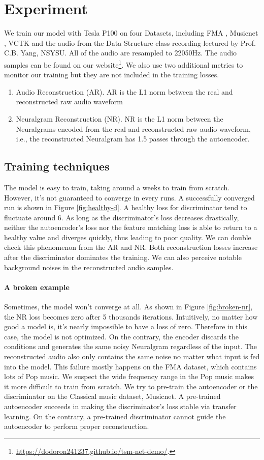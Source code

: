 \documentclass[12pt]{article}
\begin{document}
\section{Experiment}
We train our model with Tesla P100 on four Datasets, including FMA \cite{kir16}, Musicnet \cite{joh18}, VCTK \cite{yam19} and the audio from the Data Structure class recording \cite{chu21} lectured by Prof. C.B. Yang, NSYSU. All of the audio are resampled to 22050Hz. The audio samples can be found on our website\footnote{\url{https://dodoron241237.github.io/tsm-net-demo/}.}. We also use two additional metrics to monitor our training but they are not included in the training losses.
\begin{enumerate}
  \item{Audio Reconstruction (AR). AR is the L1 norm between the real and reconstructed raw audio waveform}
  \item{Neuralgram Reconstruction (NR). NR is the L1 norm between the Neuralgrams encoded from the real and reconstructed raw audio waveform, i.e., the reconstructed Neuralgram has 1.5 passes through the autoencoder.}
\end{enumerate}

\subsection{Training techniques}
The model is easy to train, taking around a weeks to train from scratch. However, it's not guaranteed to converge in every runs. A successfully converged run is shown in Figure \ref{fig:healthy-d}. A healthy loss for discriminator tend to fluctuate around 6. As long as the discriminator's loss decreases drastically, neither the autoencoder's loss nor the feature matching loss is able to return to a healthy value and diverges quickly, thus leading to poor quality. We can double check this phenomenon from the AR and NR. Both reconstruction losses increase after the discriminator dominates the training. We can also perceive notable background noises in the reconstructed audio samples.

\paragraph{A broken example} Sometimes, the model won't converge at all. As shown in Figure \ref{fig:broken-nr}, the NR loss becomes zero after 5 thousands iterations. Intuitively, no matter how good a model is, it's nearly impossible to have a loss of zero. Therefore in this case, the model is not optimized. On the contrary, the encoder discards the conditions and generates the same noisy Neuralgram regardless of the input. The reconstructed audio also only contains the same noise no matter what input is fed into the model. This failure mostly happens on the FMA dataset, which contains lots of Pop music. We suspect the wide frequency range in the Pop music makes it more difficult to train from scratch. We try to pre-train the autoencoder or the discriminator on the Classical music dataset, Musicnet. A pre-trained autoencoder succeeds in making the discriminator's loss stable via transfer learning. On the contrary, a pre-trained discriminator cannot guide the autoencoder to perform proper reconstruction.
\end{document}
